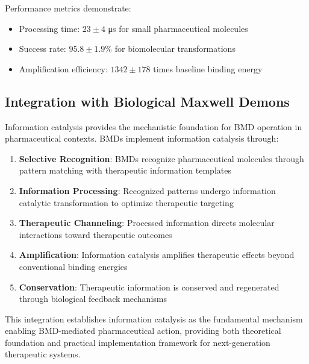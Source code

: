 Performance metrics demonstrate:
\begin{itemize}
\item Processing time: $23 \pm 4$ μs for small pharmaceutical molecules
\item Success rate: $95.8 \pm 1.9\%$ for biomolecular transformations  
\item Amplification efficiency: $1342 \pm 178$ times baseline binding energy
\end{itemize}

\subsection{Integration with Biological Maxwell Demons}

Information catalysis provides the mechanistic foundation for BMD operation in pharmaceutical contexts. BMDs implement information catalysis through:

\begin{enumerate}
\item \textbf{Selective Recognition}: BMDs recognize pharmaceutical molecules through pattern matching with therapeutic information templates
\item \textbf{Information Processing}: Recognized patterns undergo information catalytic transformation to optimize therapeutic targeting
\item \textbf{Therapeutic Channeling}: Processed information directs molecular interactions toward therapeutic outcomes
\item \textbf{Amplification}: Information catalysis amplifies therapeutic effects beyond conventional binding energies
\item \textbf{Conservation}: Therapeutic information is conserved and regenerated through biological feedback mechanisms
\end{enumerate}

This integration establishes information catalysis as the fundamental mechanism enabling BMD-mediated pharmaceutical action, providing both theoretical foundation and practical implementation framework for next-generation therapeutic systems.
